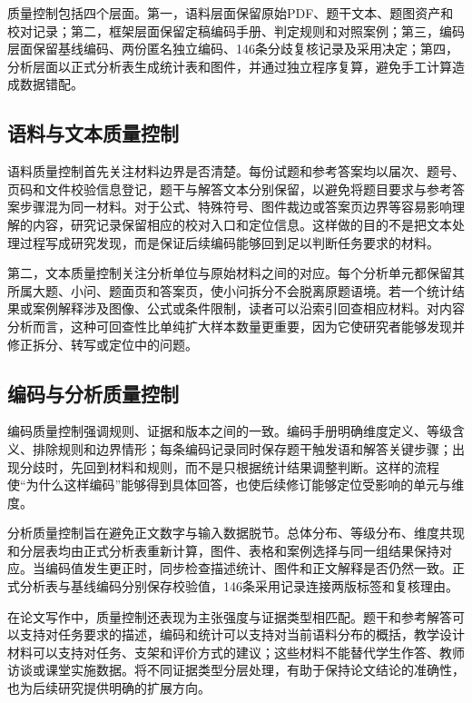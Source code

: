 \documentclass[
  12pt,
  a4paper,twoside,openany]{ctexbook}
\begin{document}
质量控制包括四个层面。第一，语料层面保留原始PDF、题干文本、题图资产和校对记录；第二，框架层面保留定稿编码手册、判定规则和对照案例；第三，编码层面保留基线编码、两份匿名独立编码、146条分歧复核记录及采用决定；第四，分析层面以正式分析表生成统计表和图件，并通过独立程序复算，避免手工计算造成数据错配。

\subsection{语料与文本质量控制}\label{ux8bedux6599ux4e0eux6587ux672cux8d28ux91cfux63a7ux5236}

语料质量控制首先关注材料边界是否清楚。每份试题和参考答案均以届次、题号、页码和文件校验信息登记，题干与解答文本分别保留，以避免将题目要求与参考答案步骤混为同一材料。对于公式、特殊符号、图件裁边或答案页边界等容易影响理解的内容，研究记录保留相应的校对入口和定位信息。这样做的目的不是把文本处理过程写成研究发现，而是保证后续编码能够回到足以判断任务要求的材料。

第二，文本质量控制关注分析单位与原始材料之间的对应。每个分析单元都保留其所属大题、小问、题面页和答案页，使小问拆分不会脱离原题语境。若一个统计结果或案例解释涉及图像、公式或条件限制，读者可以沿索引回查相应材料。对内容分析而言，这种可回查性比单纯扩大样本数量更重要，因为它使研究者能够发现并修正拆分、转写或定位中的问题。

\subsection{编码与分析质量控制}\label{ux7f16ux7801ux4e0eux5206ux6790ux8d28ux91cfux63a7ux5236}

编码质量控制强调规则、证据和版本之间的一致。编码手册明确维度定义、等级含义、排除规则和边界情形；每条编码记录同时保存题干触发语和解答关键步骤；出现分歧时，先回到材料和规则，而不是只根据统计结果调整判断。这样的流程使``为什么这样编码''能够得到具体回答，也使后续修订能够定位受影响的单元与维度。

分析质量控制旨在避免正文数字与输入数据脱节。总体分布、等级分布、维度共现和分层表均由正式分析表重新计算，图件、表格和案例选择与同一组结果保持对应。当编码值发生更正时，同步检查描述统计、图件和正文解释是否仍然一致。正式分析表与基线编码分别保存校验值，146条采用记录连接两版标签和复核理由。

在论文写作中，质量控制还表现为主张强度与证据类型相匹配。题干和参考解答可以支持对任务要求的描述，编码和统计可以支持对当前语料分布的概括，教学设计材料可以支持对任务、支架和评价方式的建议；这些材料不能替代学生作答、教师访谈或课堂实施数据。将不同证据类型分层处理，有助于保持论文结论的准确性，也为后续研究提供明确的扩展方向。
\end{document}

